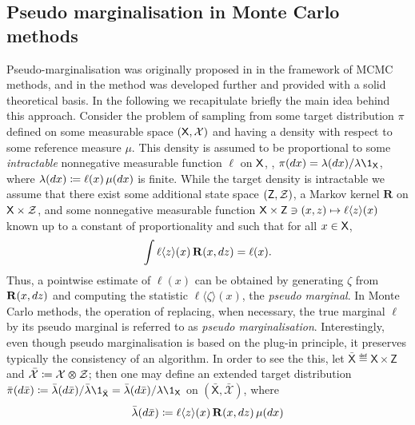 \subsection{Pseudo marginalisation in Monte Carlo methods}
\label{sec:pseudo:marginalisation}

Pseudo-marginalisation was originally proposed in \cite{beaumont:2003} in the framework of MCMC methods, and in \cite{andrieu:robert:2009} the method was developed further and provided with a solid theoretical basis. In the following we recapitulate briefly the main idea behind this approach. Consider the problem of sampling from some target distribution $\pi$ defined on some measurable space $(\mathsf{X}, \mathcal{X})$ and having a density with respect to some reference measure $\mu$. This density is assumed to be proportional to some \emph{intractable} nonnegative measurable function $\ell$ on $\mathsf{X}$, \ie, $\pi(\rmd x) = \lambda(\rmd x) / \lambda \1_\Xset$, where $\lambda(d x) \coloneqq \ell(x) \, \mu(d x)$ is finite. While the target density is intractable we assume that there exist some additional state space $(\mathsf{Z}, \mathcal{Z})$, a Markov kernel $\mathbf{R}$ on $\mathsf{X} \times \mathcal{Z}$, and some nonnegative measurable function $\mathsf{X} \times \mathsf{Z} \ni (x, z) \mapsto \ell \langle z \rangle (x)$ known up to a constant of proportionality and such that for all $x \in \mathsf{X}$, 
\begin{equation} \label{eq:pseudo:marginalisation}
\int \ell \langle z \rangle(x) \, \mathbf{R}(x, \rmd z) = \ell(x). 
\end{equation}
Thus, a pointwise estimate of $\ell(x)$ can be obtained by generating $\zeta$ from $\mathbf{R}(x, d z)$ and computing the statistic $\ell \langle \zeta \rangle(x)$, the \emph{pseudo marginal}. In Monte Carlo methods, the operation of replacing, when necessary, the true marginal $\ell$ by its pseudo marginal is referred to as \emph{pseudo marginalisation}. Interestingly, even though pseudo marginalisation is based on the plug-in principle, it preserves typically the consistency of an algorithm. In order to see the this, let $\bar{\mathsf{X}} \eqdef \mathsf{X} \times \mathsf{Z}$ and $\bar{\mathcal{X}} \coloneqq \mathcal{X} \varotimes \mathcal{Z}$; then one may define an extended target distribution $\bar{\pi}(\rmd \bar{x}) \eqdef \bar{\lambda}(\rmd \bar{x}) / \bar{\lambda} \1_{\bar{\mathsf{X}}} = \bar{\lambda}(\rmd \bar{x}) / \lambda \1_{\mathsf{X}}$ on $(\bar{\mathsf{X}}, \bar{\mathcal{X}})$, where 
\begin{equation} \label{eq:extended:target}
\bar{\lambda}(\rmd \bar{x}) \eqdef \ell \langle z \rangle(x) \, \kernel{R}(x, \rmd z) \, \mu(\rmd x)
\end{equation}
